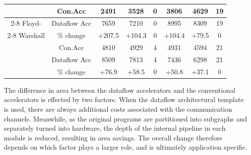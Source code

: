 \documentclass{sig-alternate}
\begin{document}
\begin{table}[htbp]
\begin{tabular}{| c | c | c | c | c | c | c | c| }
  \hline                                                                                                           
\multirow{3}{*}{}&Con.Acc  & 2491 &3528 &0 &3806  &4629  &19   \\
\cline{2-8}                                                                                                                                                    
Floyd- &Dataflow Acc       & 7659 &7210 &0  &8995  &8309 &19 \\
\cline{2-8}                                                                                                             
 Warshall      &\% change &+207.5  &+104.3 & 0 & +104.4  & +79.5  & 0  \\
  \hline                                                                                                           
\multirow{3}{*}{}&Con.Acc  & 4810 &4929 &4 & 4931 & 4594 & 21  \\
\cline{2-8}                                                                                                                                                    
DFS &Dataflow Acc       & 8509 & 7813& 4 & 7436  &6298 & 21\\
\cline{2-8}                                                                                                             
       &\% change & +76.9 &+58.5 & 0 & +50.8  & +37.1 & 0  \\
  \hline                                                                                                           

\end{tabular}
\label{tab:areacom}
\end{table}


The difference in area between the dataflow accelerators and the conventional accelerators is effected by
two factors.  
When the dataflow architectural template is used, there are always additional costs associated with the communication channels. Meanwhile, as
the original programs are partitioned into subgraphs and separately turned into hardware, the depth of the internal 
pipeline in each module is reduced, resulting in area savings. 
The overall change therefore depends on which factor plays a larger role, and is 
ultimately application specific. 
\end{document}
